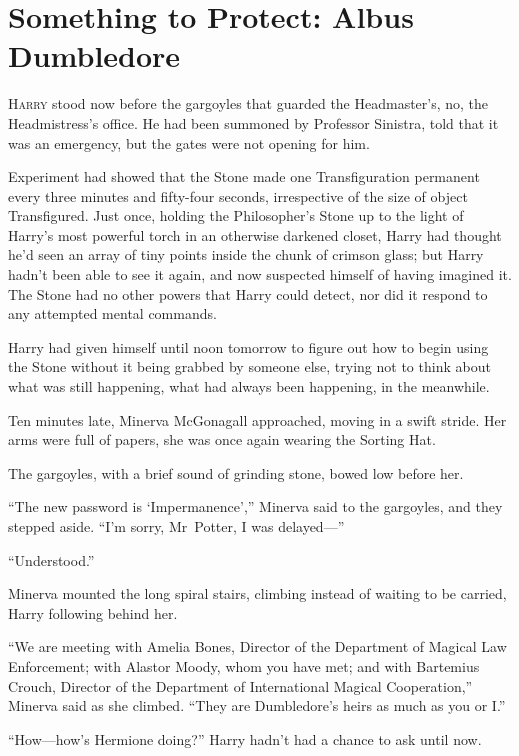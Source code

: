 \chapter{Something to Protect: Albus Dumbledore}

\lettrine{H}{arry} stood now before the gargoyles that guarded the Headmaster’s, no, the Headmistress’s office. He had been summoned by Professor Sinistra, told that it was an emergency, but the gates were not opening for him.

Experiment had showed that the Stone made one Transfiguration permanent every three minutes and fifty-four seconds, irrespective of the size of object Transfigured. Just once, holding the Philosopher’s Stone up to the light of Harry’s most powerful torch in an otherwise darkened closet, Harry had thought he’d seen an array of tiny points inside the chunk of crimson glass; but Harry hadn’t been able to see it again, and now suspected himself of having imagined it. The Stone had no other powers that Harry could detect, nor did it respond to any attempted mental commands.

Harry had given himself until noon tomorrow to figure out how to begin using the Stone without it being grabbed by someone else, trying not to think about what was still happening, what had always been happening, in the meanwhile.

Ten minutes late, Minerva McGonagall approached, moving in a swift stride. Her arms were full of papers, she was once again wearing the Sorting Hat.

The gargoyles, with a brief sound of grinding stone, bowed low before her.

“The new password is ‘Impermanence’,” Minerva said to the gargoyles, and they stepped aside. “I’m sorry, Mr~Potter, I was delayed—”

“Understood.”

Minerva mounted the long spiral stairs, climbing instead of waiting to be carried, Harry following behind her.

“We are meeting with Amelia Bones, Director of the Department of Magical Law Enforcement; with Alastor Moody, whom you have met; and with Bartemius Crouch, Director of the Department of International Magical Cooperation,” Minerva said as she climbed. “They are Dumbledore’s heirs as much as you or I.”

“How—how’s Hermione doing?” Harry hadn’t had a chance to ask until now.

